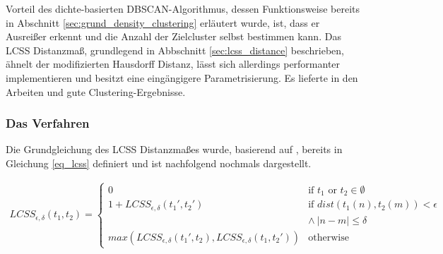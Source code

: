 Vorteil des dichte-basierten DBSCAN-Algorithmus, dessen Funktionsweise bereits in Abschnitt
\ref{sec:grund_density_clustering} erläutert wurde, ist, dass er Ausreißer erkennt und die Anzahl der
Zielcluster selbst bestimmen kann. Das LCSS Distanzmaß, grundlegend in Abbschnitt \ref{sec:lcss_distance}
beschrieben, ähnelt der modifizierten Hausdorff Distanz, lässt sich allerdings performanter implementieren
und besitzt eine eingängigere Parametrisierung. Es lieferte in den Arbeiten \cite[]{Morris2011} und
\cite[]{Chen2014} gute Clustering-Ergebnisse.

\subsubsection{Das Verfahren}

Die Grundgleichung des LCSS Distanzmaßes wurde, basierend auf \cite[]{Vlachos2002}, bereits in Gleichung
\ref{eq_lcss} definiert und ist nachfolgend nochmals dargestellt.

\begin{ceqn}
\begin{align*}
    LCSS_{\epsilon, \delta}(t_1, t_2) =
    \begin{cases}
        0 & \text{if } t_1 \text{ or } t_2 \in \emptyset \\
        1 + LCSS_{\epsilon, \delta}(t_1', t_2') & \text{if } dist(t_1(n), t_2(m)) < \epsilon \\
        & \land\ |n - m| \leq \delta \\
        max(LCSS_{\epsilon, \delta}(t_1', t_2), LCSS_{\epsilon, \delta}(t_1, t_2')) & \text{otherwise}
    \end{cases}
\end{align*}
\end{ceqn}

